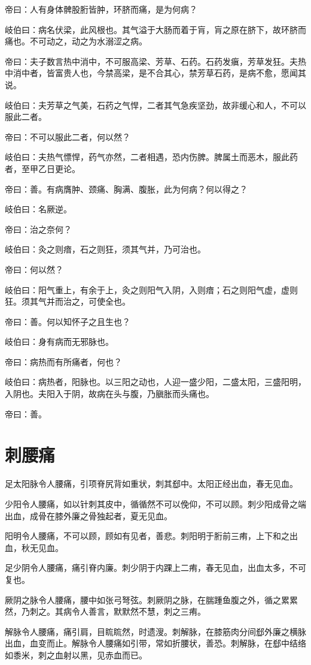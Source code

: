 \documentclass{article}%
\begin{document}
帝曰：人有身体髀股胻皆肿，环脐而痛，是为何病？

岐伯曰：病名伏梁，此风根也。其气溢于大肠而着于肓，肓之原在脐下，故环脐而痛也。不可动之，动之为水溺涩之病。

帝曰：夫子数言热中消中，不可服高梁、芳草、石药。石药发瘨，芳草发狂。夫热中消中者，皆富贵人也，今禁高梁，是不合其心，禁芳草石药，是病不愈，愿闻其说。

岐伯曰：夫芳草之气美，石药之气悍，二者其气急疾坚劲，故非缓心和人，不可以服此二者。

帝曰：不可以服此二者，何以然？

岐伯曰：夫热气慓悍，药气亦然，二者相遇，恐内伤脾。脾属土而恶木，服此药者，至甲乙日更论。

帝曰：善。有病膺肿、颈痛、胸满、腹胀，此为何病？何以得之？

岐伯曰：名厥逆。

帝曰：治之奈何？

岐伯曰：灸之则瘖，石之则狂，须其气并，乃可治也。

帝曰：何以然？

岐伯曰：阳气重上，有余于上，灸之则阳气入阴，入则瘖；石之则阳气虚，虚则狂。须其气并而治之，可使全也。

帝曰：善。何以知怀子之且生也？

岐伯曰：身有病而无邪脉也。

帝曰：病热而有所痛者，何也？

岐伯曰：病热者，阳脉也。以三阳之动也，人迎一盛少阳，二盛太阳，三盛阳明，入阴也。夫阳入于阴，故病在头与腹，乃䐜胀而头痛也。

帝曰：善。
\section{刺腰痛}
足太阳脉令人腰痛，引项脊尻背如重状，刺其郄中。太阳正经出血，春无见血。

少阳令人腰痛，如以针刺其皮中，循循然不可以俛仰，不可以顾。刺少阳成骨之端出血，成骨在膝外廉之骨独起者，夏无见血。

阳明令人腰痛，不可以顾，顾如有见者，善悲。刺阳明于胻前三痏，上下和之出血，秋无见血。

足少阴令人腰痛，痛引脊内廉。刺少阴于内踝上二痏，春无见血，出血太多，不可复也。

厥阴之脉令人腰痛，腰中如张弓弩弦。刺厥阴之脉，在腨踵鱼腹之外，循之累累然，乃刺之。其病令人善言，默默然不慧，刺之三痏。

解脉令人腰痛，痛引肩，目䀮䀮然，时遗溲。刺解脉，在膝筋肉分间郄外廉之横脉出血，血变而止。解脉令人腰痛如引带，常如折腰状，善恐。刺解脉，在郄中结络如黍米，刺之血射以黑，见赤血而已。
\end{document}
